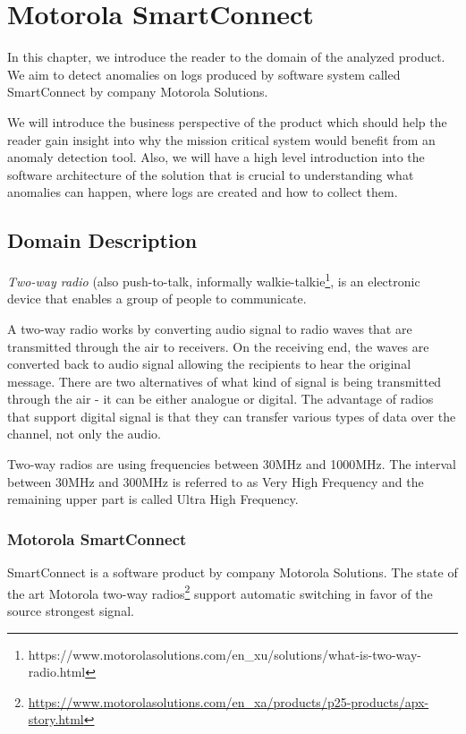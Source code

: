 \chapter{Motorola SmartConnect}
\label{smart-connect}
In this chapter, we introduce the reader to the domain of the analyzed product.
We aim to detect anomalies on logs produced by software system called SmartConnect by company Motorola Solutions.

We will introduce the business perspective of the product which should help the reader gain insight into why the mission critical system would benefit from an anomaly detection tool.
Also, we will have a high level introduction into the software architecture of the solution that is crucial to understanding what anomalies can happen, where logs are created and how to collect them.

\section{Domain Description}

\textit{Two-way radio} (also push-to-talk, informally walkie-talkie\footnote{https://www.motorolasolutions.com/en\_xu/solutions/what-is-two-way-radio.html}, is an electronic device that enables a group of people to communicate.

A two-way radio works by converting audio signal to radio waves that are transmitted through the air to receivers. On the receiving end, the waves are converted back to audio signal allowing the recipients to hear the original message.
There are two alternatives of what kind of signal is being transmitted through the air - it can be either analogue or digital.
The advantage of radios that support digital signal is that they can transfer various types of data over the channel, not only the audio.

Two-way radios are using frequencies between 30MHz and 1000MHz. The interval between 30MHz and 300MHz is referred to as Very High Frequency and the remaining upper part is called Ultra High Frequency.



\subsection{Motorola SmartConnect}

SmartConnect is a software product by company Motorola Solutions. 
The state of the art Motorola two-way radios\footnote{\url{https://www.motorolasolutions.com/en_xa/products/p25-products/apx-story.html}} support automatic switching in favor of the source strongest signal.

